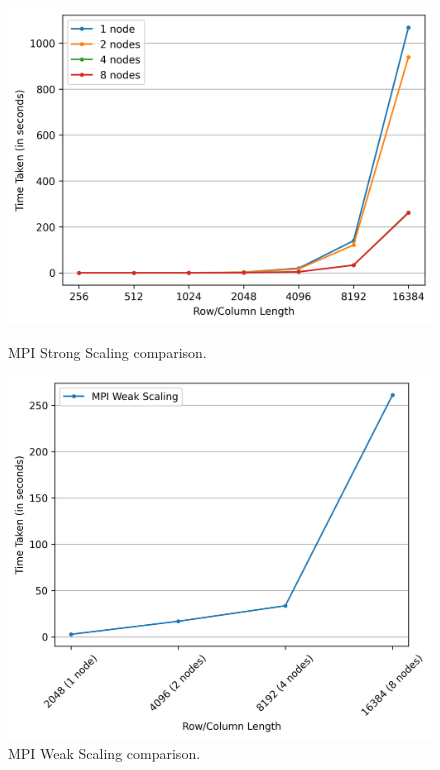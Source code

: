 \begin{figure}[h!]
    \centering
    \begin{minipage}[t]{0.49\textwidth}
        \centering
         \includegraphics[width=\textwidth]{img/MPI/mpi_strong_scaling.png}
        \caption{MPI Strong Scaling comparison.}
        \label{MPI_4_8_NODES}
    \end{minipage}
    \hfill
    \begin{minipage}[t]{0.49\textwidth}
        \centering
        \includegraphics[width=\textwidth]{img/MPI/mpi_weak_scaling.png}
        \caption{MPI Weak Scaling comparison.}
        \label{MPI_WEAK_SCALING}
    \end{minipage}
    

\end{figure}
